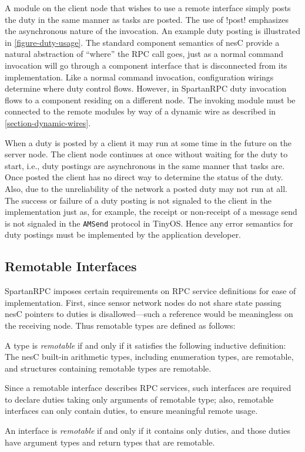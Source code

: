 A module on the client node that wishes to use a remote interface simply posts the duty in the
same manner as tasks are posted. The use of !post! emphasizes the asynchronous nature of the
invocation. An example duty posting is illustrated in \autoref{figure-duty-usage}. The standard
component semantics of nesC provide a natural abstraction of ``where'' the RPC call goes, just
as a normal command invocation will go through a component interface that is disconnected from
its implementation. Like a normal command invocation, configuration wirings determine where duty
control flows. However, in SpartanRPC duty invocation flows to a component residing on a
different node. The invoking module must be connected to the remote modules by way of a dynamic
wire as described in \autoref{section-dynamic-wires}.

When a duty is posted by a client it may run at some time in the future on the server node. The
client node continues at once without waiting for the duty to start, i.e., duty postings are
asynchronous in the same manner that tasks are. Once posted the client has no direct way to
determine the status of the duty. Also, due to the unreliability of the network a posted duty
may not run at all. The success or failure of a duty posting is not signaled to the client in
the implementation just as, for example, the receipt or non-receipt of a message send is not
signaled in the \texttt{AMSend} protocol in TinyOS. Hence any error semantics for duty postings
must be implemented by the application developer.

\subsection{Remotable Interfaces}
\label{section-remotable}

SpartanRPC imposes certain requirements on RPC service definitions for ease of implementation.
First, since sensor network nodes do not share state passing nesC pointers to duties is
disallowed---such a reference would be meaningless on the receiving node. Thus remotable types
are defined as follows:
\begin{definition}
  A type is \emph{remotable} if and only if it satisfies the following inductive definition: The
  nesC built-in arithmetic types, including enumeration types, are remotable, and structures
  containing remotable types are remotable.
\end{definition}
Since a remotable interface describes RPC services, such interfaces are required to declare
duties taking only arguments of remotable type; also, remotable interfaces can only contain
duties, to ensure meaningful remote usage.
\begin{definition}
  An interface is \emph{remotable} if and only if it contains only duties, and those duties have
  argument types and return types that are remotable.
\end{definition}

